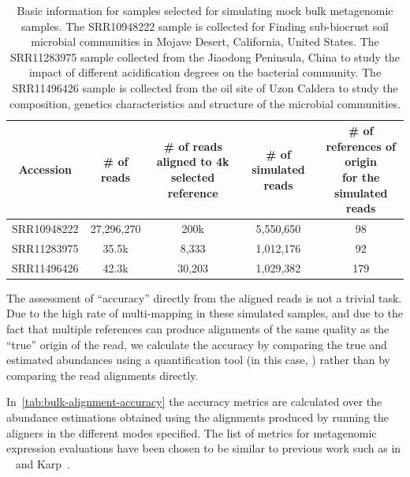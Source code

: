 \begin{table}\centering
    \caption[Information for samples selected for simulating mock bulk metagenomic samples]
    {Basic information for samples selected for simulating mock bulk metagenomic samples. 
    The SRR10948222 sample is collected for Finding sub-biocrust soil microbial communities in Mojave Desert, 
    California, United States. The SRR11283975 sample collected from the Jiaodong Peninsula, China to study the 
    impact of different acidification degrees on the bacterial community. The SRR11496426 sample is collected 
    from the oil site of Uzon Caldera to study the composition, genetics characteristics and structure of the 
    microbial communities.}    
    \begin{tabular}{c||cccc} 
    \toprule
    Accession
    & \# of reads
    & \parbox[c]{2cm}{\# of reads \\ aligned to 4k selected reference }
    & \# of simulated reads
    & \parbox[c]{3cm}{\# of references of origin \\ for the simulated reads \\ }  \\
    \midrule
    SRR10948222
    & 27,296,270 & 200k & 5,550,650 & 98 \\
    \midrule
    SRR11283975
    & 35.5k & 8,333 & 1,012,176 & 92 \\
    \midrule
    SRR11496426
    & 42.3k & 30,203 & 1,029,382 & 179 \\
    \bottomrule
\end{tabular}
\label{tab:metagenome_sample_info}
\end{table}

The assessment of ``accuracy'' directly from the aligned reads is not a trivial task.
Due to the high rate of multi-mapping in these simulated samples, and due to the fact that multiple references 
can produce alignments of the same quality as the ``true'' origin of the read, we calculate the accuracy by 
comparing the true and estimated abundances using a quantification tool (in this case, \salmon) rather than 
by comparing the read alignments directly.

In~\cref{tab:bulk-alignment-accuracy} the accuracy metrics are calculated
over the abundance estimations obtained using the alignments produced by 
running the aligners in the different modes specified. The list of metrics for
metagenomic expression evaluations have been chosen to be similar to previous
work such as in \br~\citep{lu2017bracken} and Karp~\citep{reppell2018using}.

